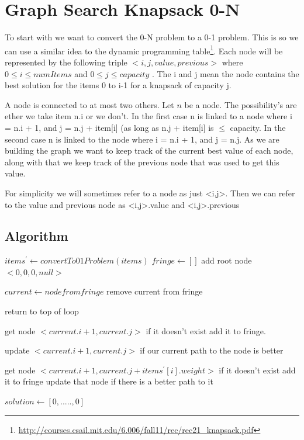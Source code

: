 \documentclass{article}
\begin{document}
	\section{Graph Search Knapsack 0-N}
		To start with we want to convert the 0-N problem to a 0-1 problem. This is so we can use a similar idea to the dynamic programming table\footnote{\url{http://courses.csail.mit.edu/6.006/fall11/rec/rec21_knapsack.pdf}}. Each node will be represented by the following triple $<i, j, value, previous>$ where $0 \leqslant i \leqslant numItems$ and $0 \leqslant j \leqslant capacity$ . The i and j mean the node contains the best solution for the items 0 to i-1 for a knapsack of capacity j.\newline\newline
		
		A node is connected to at most two others. Let $n$ be a node. The possibility's are ether we take item n.i or we don't. In the first case n is linked to a node where i = n.i + 1, and j = n.j + item[i] (as long as n.j + item[i] is $\leqslant$ capacity. In the second case n is linked to the node where i = n.i + 1, and j = n.j. As we are building the graph we want to keep track of the current best value of each node, along with that we keep track of the previous node that was used to get this value.
		
		For simplicity we will sometimes refer to a node as just <i,j>. Then we can refer to the value and previous node as <i,j>.value and <i,j>.previous
	
		\subsection{Algorithm}
			\begin{algorithm}
				\begin{algorithmic}[1]
						\State $items^\prime \gets convertTo01Problem(items)$
						\State $fringe \gets []$
						\State add root node $<0, 0, 0, null>$
						
							\State $current \gets node from fringe$
							\State remove current from fringe
						
								\State return to top of loop
							\EndIf
							
							\State get node $<current.i + 1,current.j>$ if it doesn't exist add it to fringe.
							
							\State update $<current.i + 1,current.j>$ if our current path to the node is better
							
								\State get node $<current.i + 1,current.j + items ^\prime[i].weight>$ if it doesn't exist add it to fringe
								\State update that node if there is a better path to it
							\EndIf
							
						\EndWhile
						
						\State $solution \gets [0,.....,0]$  
					\EndProcedure
				\end{algorithmic}
			\end{algorithm}
		
\end{document}
